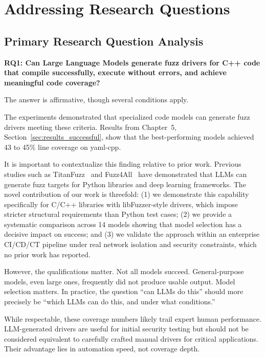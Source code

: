 \section{Addressing Research Questions}
\label{sec:discussion_rq}

\subsection{Primary Research Question Analysis}
\label{sec:discussion_rq_primary}

\textbf{RQ1: Can Large Language Models generate fuzz drivers for C++ code that compile successfully, execute without errors, and achieve meaningful code coverage?}

The answer is affirmative, though several conditions apply.

The experiments demonstrated that specialized code models can generate fuzz drivers meeting these criteria. Results from Chapter~5, Section~\ref{sec:results_successful}, show that the best-performing models achieved 43 to 45\% line coverage on yaml-cpp.

It is important to contextualize this finding relative to prior work. Previous studies such as TitanFuzz~\cite{TitanFuzz2022} and Fuzz4All~\cite{Fuzz4All2023} have demonstrated that LLMs can generate fuzz targets for Python libraries and deep learning frameworks. The novel contribution of our work is threefold: (1) we demonstrate this capability specifically for C/C++ libraries with libFuzzer-style drivers, which impose stricter structural requirements than Python test cases; (2) we provide a systematic comparison across 14 models showing that model selection has a decisive impact on success; and (3) we validate the approach within an enterprise CI/CD/CT pipeline under real network isolation and security constraints, which no prior work has reported.

However, the qualifications matter. Not all models succeed. General-purpose models, even large ones, frequently did not produce usable output. Model selection matters. In practice, the question ``can LLMs do this'' should more precisely be ``which LLMs can do this, and under what conditions.''

While respectable, these coverage numbers likely trail expert human performance. LLM-generated drivers are useful for initial security testing but should not be considered equivalent to carefully crafted manual drivers for critical applications. Their advantage lies in automation speed, not coverage depth.

